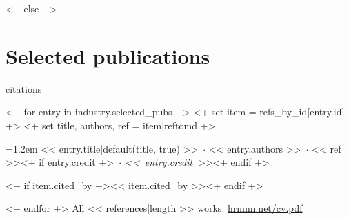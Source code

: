 \documentclass[10pt]{article}
\makeatletter
\def\SmallDotuline#1{\bgroup%
  \UL@setULdepth%
  \markoverwith{\begingroup
     \advance\ULdepth0.08ex
     \lower\ULdepth\hbox{\scalebox{0.4}{.}\kern#1}%
     \endgroup}%
  \ULon}
\newcommand{\udot}[1]{\SmallDotuline{0pt}{#1}}
\let\oldhref\href%
\renewcommand{\href}[2]{\oldhref{#1}{\udot{#2}}}
\makeatother
\begin{document}
<+ else +>
\section{Selected publications}
{\footnotesize
\renewcommand{\udot}[1]{\textcolor{accent}{#1}}
{\raggedleft\scriptsize\color{black!45}citations\par}
\vspace{-0.15em}
<+ for entry in industry.selected_pubs +>
<+ set item = refs_by_id[entry.id] +>
<+ set title, authors, ref = item|reftomd +>
\noindent\parbox[t]{\dimexpr\linewidth-2.6em\relax}{\hangindent=1.2em << entry.title|default(title, true) >>~$\cdot$ << entry.authors >>~$\cdot$ << ref >><+ if entry.credit +>~$\cdot$ \mbox{\emph{<< entry.credit >>}}<+ endif +>}\hfill\parbox[t]{2em}{\raggedleft\color{black!60}<+ if item.cited_by +><< item.cited_by >><+ endif +>}\par\vspace{1.5pt}
<+ endfor +>
\vspace{0.25em}
{\color{black!60}All << references|length >> works: \href{https://hrmnn.net/cv.pdf}{hrmnn.net/cv.pdf}}\par
}
\end{document}
